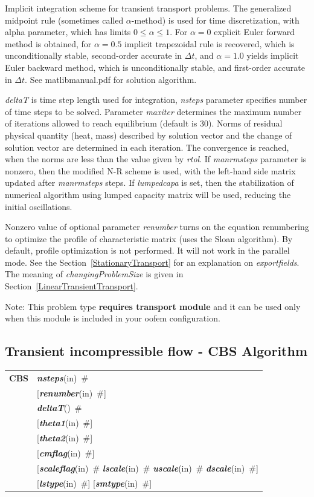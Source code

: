 \documentclass[a4paper]{article}
\makeatletter
\newcommand{\param}[1]{{\em #1}}
\newcommand{\keywordnotype}[1]{\mbox{{\it{\bf{#1}}}}}
\newcommand{\keyword}[2]{\mbox{{\keywordnotype{#1}\tiny (#2)}}}
\newcommand{\entKeywordInst}[1]{\mbox{{\bf{{#1}}}}}
\newcommand{\field}[2]{\mbox{\keyword{#1}{#2}~\#}}
\newcommand{\optField}[2]{\mbox{[\field{#1}{#2}]}}
\newenvironment{record}[1][]{\begin{tabular}{|ll}}{\end{tabular}\\}
\newcommand{\recentry}[2]{{#1}&{#2}\\}
\newcounter{rcc}
\newenvironment{record}[1][\textwidth]{\setcounter{rcc}{0}\begin{tabular*}{#1}{|ll@{\extracolsep{\fill}}r}}{\end{tabular*}\\}
\newcommand{\recentry}[2]{\ifthenelse{\value{rcc}>0}{&$\backslash$ \\}{\setcounter{rcc}{1}}{#1}&{#2}}
\makeatother
\begin{document}
Implicit integration scheme for transient transport problems. The generalized
midpoint rule (sometimes called $\alpha$-method) is used for time discretization, with alpha parameter,
which has limits $0\le\alpha\le1$. For $\alpha=0$ explicit Euler
forward method is obtained, for $\alpha=0.5$ implicit trapezoidal rule
is recovered, which is unconditionally stable, second-order accurate
in $\Delta t$, and $\alpha=1.0$ yields implicit Euler backward method,
which is unconditionally stable, and first-order accurate
in $\Delta t$. See matlibmanual.pdf for solution algorithm.

\param{deltaT} is time step length used for
integration, \param{nsteps} parameter specifies
number of time steps to be solved. Parameter \param{maxiter} determines the maximum
number of iterations allowed to reach equilibrium (default is 30). Norms of
residual physical quantity (heat, mass) described by solution vector and 
the change of solution vector are determined in each iteration.
The convergence is reached, when the norms are less than the value given by \param{rtol}.
If \param{manrmsteps} parameter is nonzero, then the modified
N-R scheme is used, with the left-hand side matrix updated after
\param{manrmsteps} steps.
If \param{lumpedcapa} is set, then the stabilization of numerical
algorithm using lumped capacity matrix will be used, reducing the
initial oscillations.

Nonzero value of optional parameter \param{renumber} turns on the
equation renumbering to optimize the profile of characteristic matrix
(uses the Sloan algorithm). By default, profile optimization is not
performed. It will not work in the parallel mode.
See the Section~\ref{StationaryTransport} for an explanation on
\param{exportfields}. The meaning 
of \param{changingProblemSize} is given in Section~\ref{LinearTransientTransport}.

Note: This problem type {\bf requires transport module} and it
can be used only when this module is included in your oofem
configuration.

\subsection{Transient incompressible flow - CBS Algorithm}
\label{cbsIncomp}
\begin{record}
\recentry{\entKeywordInst{CBS}}{\field{nsteps}{in}}
\recentry{}{\optField{renumber}{in}}
\recentry{}{\field{deltaT}{}} \recentry{}{\optField{theta1}{in}} \recentry{}{\optField{theta2}{in}}
\recentry{}{\optField{cmflag}{in}}
\recentry{}{[\field{scaleflag}{in} \field{lscale}{in} \field{uscale}{in} \field{dscale}{in}]}
\recentry{}{\optField{lstype}{in} \optField{smtype}{in}}
\end{record}
\end{document}
